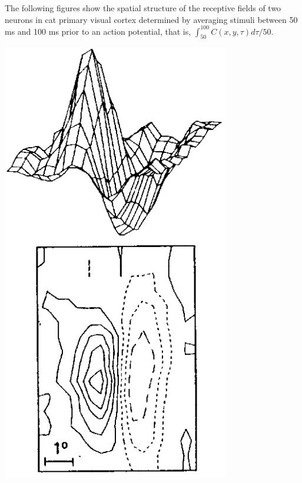\begin{exm}
  \label{exm:spatialExm}
  The following figures show the spatial structure of the receptive fields of two neurons in cat primary visual cortex determined by averaging stimuli between 50 ms and 100 ms prior to an action potential, that is, $\int_{50}^{100}C(x,y,\tau)d\tau/50$.
  \begin{center}
    \includegraphics[scale=0.25]{./png/spatialExm1}

\end{center}
\end{exm}
